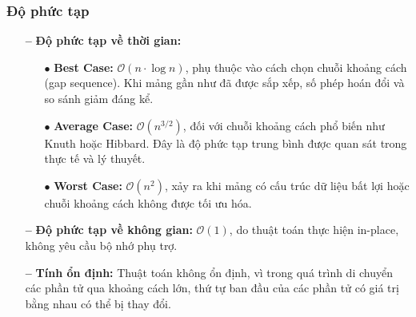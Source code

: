 \subsubsection{Độ phức tạp}
\begin{itemize}
    \item[\textbf{--}] \textbf{Độ phức tạp về thời gian:}
    \begin{itemize}
        \item[$\bullet$] \textbf{Best Case:} $\mathcal{O}(n \cdot \log n)$, phụ thuộc vào cách chọn chuỗi khoảng cách (gap sequence). Khi mảng gần như đã được sắp xếp, số phép hoán đổi và so sánh giảm đáng kể.\cite{vishweshwarayya975find}
        \item[$\bullet$] \textbf{Average Case:} $\mathcal{O}(n^{3/2})$, đối với chuỗi khoảng cách phổ biến như Knuth hoặc Hibbard. Đây là độ phức tạp trung bình được quan sát trong thực tế và lý thuyết.\cite{jiang1999average}
        \item[$\bullet$] \textbf{Worst Case:} $\mathcal{O}(n^2)$, xảy ra khi mảng có cấu trúc dữ liệu bất lợi hoặc chuỗi khoảng cách không được tối ưu hóa.\cite{vishweshwarayya975find}
    \end{itemize}
    \item[\textbf{--}] \textbf{Độ phức tạp về không gian:} $\mathcal{O}(1)$, do thuật toán thực hiện in-place, không yêu cầu bộ nhớ phụ trợ.
    \item[\textbf{--}] \textbf{Tính ổn định:} Thuật toán không ổn định, vì trong quá trình di chuyển các phần tử qua khoảng cách lớn, thứ tự ban đầu của các phần tử có giá trị bằng nhau có thể bị thay đổi.
\end{itemize}
